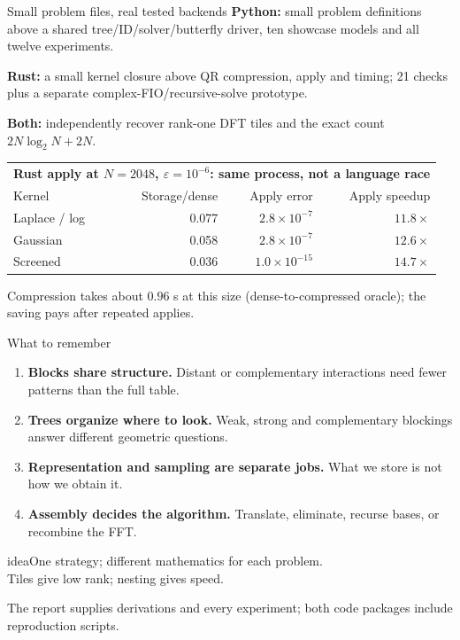 \documentclass[aspectratio=169,11pt]{beamer}
\newcommand{\takeaway}[1]{\begin{beamercolorbox}[sep=0.8ex,rounded=true]{idea}\centering\large #1\end{beamercolorbox}}
\newcommand{\eps}{\varepsilon}
\begin{document}
\begin{frame}{Small problem files, real tested backends}
 \small
 \textbf{Python:} small problem definitions above a shared tree/ID/solver/butterfly driver, ten showcase models and all twelve experiments.

 \textbf{Rust:} a small kernel closure above QR compression, apply and timing; 21 checks plus a separate complex-FIO/recursive-solve prototype.

 \textbf{Both:} independently recover rank-one DFT tiles and the exact count $2N\log_2N+2N$.

\vspace{2mm}
\begin{center}
\small
\begin{tabular}{@{}lrrr@{}}
\toprule
\multicolumn{4}{c}{\textbf{Rust apply at $N=2048$, $\eps=10^{-6}$: same process, not a language race}}\\
Kernel & Storage/dense & Apply error & Apply speedup\\
\midrule
Laplace / log & 0.077 & $2.8\times10^{-7}$ & $11.8\times$\\
Gaussian & 0.058 & $2.8\times10^{-7}$ & $12.6\times$\\
Screened & 0.036 & $1.0\times10^{-15}$ & $14.7\times$\\
\bottomrule
\end{tabular}
\end{center}
\vspace{1mm}
{\footnotesize Compression takes about $0.96$ s at this size (dense-to-compressed oracle); the saving pays after repeated applies.}
\end{frame}

\begin{frame}{What to remember}
\begin{enumerate}
 \item \textbf{Blocks share structure.} Distant or complementary interactions need fewer patterns than the full table.
 \item \textbf{Trees organize where to look.} Weak, strong and complementary blockings answer different geometric questions.
 \item \textbf{Representation and sampling are separate jobs.} What we store is not how we obtain it.
 \item \textbf{Assembly decides the algorithm.} Translate, eliminate, recurse bases, or recombine the FFT.
\end{enumerate}
\vspace{3mm}
\takeaway{One strategy; different mathematics for each problem.\\ Tiles give low rank; nesting gives speed.}
\vspace{3mm}
\small
The report supplies derivations and every experiment; both code packages include reproduction scripts.
\end{frame}
\end{document}
